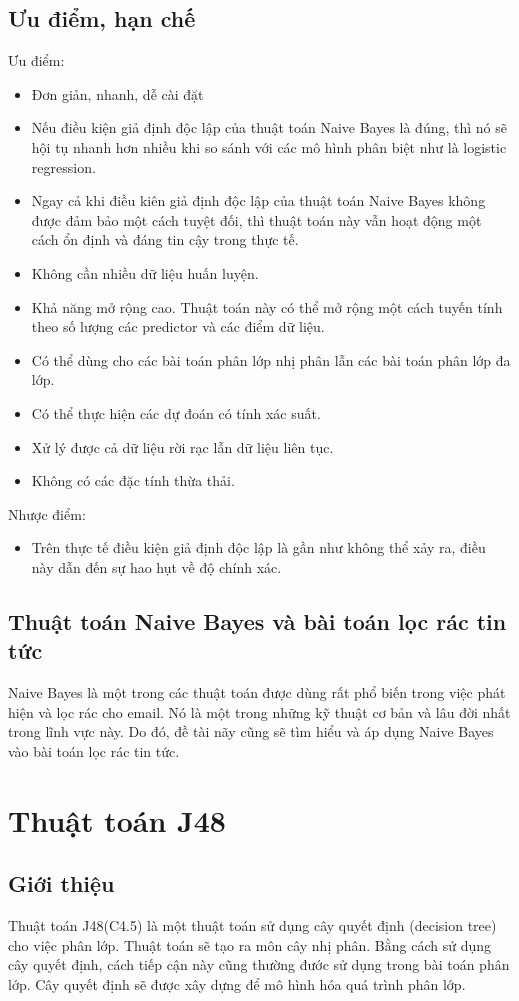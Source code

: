 \subsection{Ưu điểm, hạn chế}
Ưu điểm:
\begin{itemize}
  \item Đơn giản, nhanh, dễ cài đặt
  \item Nếu điều kiện giả định độc lập của thuật toán Naive Bayes là đúng, thì nó sẽ hội tụ nhanh hơn nhiều khi so sánh với các mô hình phân biệt như là logistic regression.
  \item Ngay cả khi điều kiên giả định độc lập của thuật toán Naive Bayes không được đảm bảo một cách tuyệt đối, thì thuật toán này vẫn hoạt động một cách ổn định và đáng tin cậy trong thực tế. 
  \item Không cần nhiều dữ liệu huấn luyện.
  \item Khả năng mở rộng cao. Thuật toán này có thể mở rộng một cách tuyến tính theo số lượng các predictor và các điểm dữ liệu.
  \item Có thể dùng cho các bài toán phân lớp nhị phân lẫn các bài toán phân lớp đa lớp.
  \item Có thể thực hiện các dự đoán có tính xác suất.
  \item Xử lý được cả dữ liệu rời rạc lẫn dữ liệu liên tục.
  \item Không có các đặc tính thừa thải.
\end{itemize}
Nhược điểm:
\begin{itemize}
  \item Trên thực tế điều kiện giả định độc lập là gần như không thể xảy ra, điều này dẫn đến sự hao hụt về độ chính xác.
\end{itemize}
\subsection{Thuật toán Naive Bayes và bài toán lọc rác tin tức}
Naive Bayes là một trong các thuật toán được dùng rất phổ biến trong việc phát hiện và lọc rác cho email. Nó là một trong những kỹ thuật cơ bản và lâu đời nhất trong lĩnh vực này. Do đó, đề tài nãy cũng sẽ tìm hiểu và áp dụng Naive Bayes vào bài toán lọc rác tin tức.

\section{Thuật toán J48}
\subsection{Giới thiệu}
Thuật toán J48(C4.5) là một thuật toán sử dụng cây quyết định (decision tree) cho việc phân lớp. Thuật toán sẽ tạo ra môn cây nhị phân. Bằng cách sử dụng cây quyết định, cách tiếp cận này cũng thường đước sử dụng trong bài toán phân lớp. Cây quyết định sẽ được xây dựng để mô hình hóa quá trình phân lớp.


